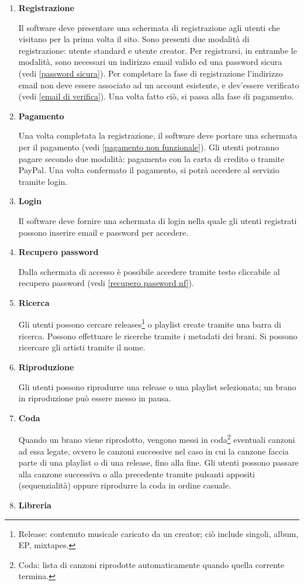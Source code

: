 \documentclass[a4paper,12pt]{article}
\begin{document}
\begin{enumerate}[label=\textbf{RF\arabic*}\;, ref=\textbf{RF\arabic*}]
    \item \label{registrazione} \textbf{Registrazione}
    
    Il software deve presentare una schermata di registrazione agli utenti che visitano per la prima volta il sito. Sono presenti due modalità di registrazione: utente standard e utente creator. Per registrarsi, in entrambe le modalità, sono necessari un indirizzo email valido ed una password sicura (vedi \ref{password sicura}). Per completare la fase di registrazione l'indirizzo email non deve essere associato ad un account esistente, e dev'essere verificato (vedi \ref{email di verifica}). Una volta fatto ciò, si passa alla fase di pagamento.
    \item \label{pagamento} \textbf{Pagamento}

    Una volta completata la registrazione, il software deve portare una schermata per il pagamento (vedi \ref{pagamento non funzionale}). Gli utenti potranno pagare secondo due modalità: pagamento con la carta di credito o tramite PayPal. Una volta confermato il pagamento, si potrà accedere al servizio tramite login.
    \item \label{login} \textbf{Login}
    
    Il software deve fornire una schermata di login nella quale gli utenti registrati possono inserire email e password per accedere.
    \item \label{recupero password} \textbf{Recupero password}

    Dalla schermata di accesso è possibile accedere tramite testo cliccabile al recupero password (vedi \ref{recupero password nf}).
    \item \label{ricerca} \textbf{Ricerca}
    
    Gli utenti possono cercare releases\footnote{Release: contenuto musicale caricato da un creator; ciò include singoli, album, EP, mixtapes.} o playlist create tramite una barra di ricerca. Possono effettuare le ricerche tramite i metadati dei brani. Si possono ricercare gli artisti tramite il nome.
    \item \label{riproduzione} \textbf{Riproduzione}
    
    Gli utenti possono riprodurre una release o una playlist selezionata; un brano in riproduzione può essere messo in pausa.
    \item \label{coda} \textbf{Coda}

    Quando un brano viene riprodotto, vengono messi in coda\footnote{Coda: lista di canzoni riprodotte automaticamente quando quella corrente termina.} eventuali canzoni ad essa legate, ovvero le canzoni successive nel caso in cui la canzone faccia parte di una playlist o di una release, fino alla fine. Gli utenti possono passare alla canzone successiva o alla precedente tramite pulsanti appositi (sequenzialità) oppure riprodurre la coda in ordine casuale.
    \item \label{libreria} \textbf{Libreria}


\end{enumerate}
\end{document}
